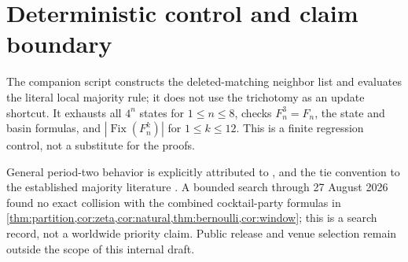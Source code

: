\documentclass[11pt,a4paper]{amsart}
\theoremstyle{definition}
\theoremstyle{remark}
\newcommand{\Fix}{\operatorname{Fix}}
\begin{document}
\section{Deterministic control and claim boundary}

The companion script constructs the deleted-matching neighbor list and
evaluates the literal local majority rule; it does not use the trichotomy as
an update shortcut.  It exhausts all $4^n$ states for $1\leq n\leq8$, checks
$F_n^3=F_n$, the state and basin formulas, and $|\Fix(F_n^k)|$ for
$1\leq k\leq12$.  This is a finite regression control, not a substitute for
the proofs.

General period-two behavior is explicitly attributed to
\citet{GolesOlivos1980}, and the tie convention to the established majority
literature \cite{GinosarHolzman2000}.  A bounded search through 27 August
2026 found no exact collision with the combined cocktail-party formulas in
\cref{thm:partition,cor:zeta,cor:natural,thm:bernoulli,cor:window}; this is a
search record, not a worldwide priority claim.  Public release and venue
selection remain outside the scope of this internal draft.



\end{document}
